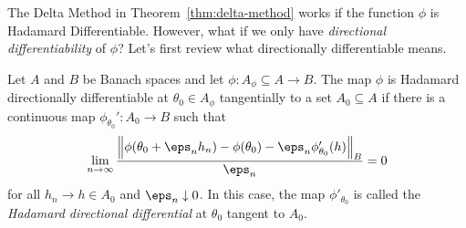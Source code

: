 The Delta Method in Theorem~\ref{thm:delta-method} works if the function \(\phi\) is Hadamard Differentiable. However, what if we only have  \textit{directional differentiability} of \(\phi\)? Let's first review what directionally differentiable means. 
\begin{definition}
	\label{def:directional-hadamard}
	Let \(A\) and  \(B\) be Banach spaces and let  \(\phi: A_\phi \subseteq A \to B\). The map  \(\phi\) is Hadamard directionally differentiable at  \(\theta_0 \in A_{\phi}\) tangentially to a set  \(A_0 \subseteq A\) if there is a continuous map  \(\phi_{\theta_0}':A_0\to B\) such that 
	\begin{equation}
		\label{eq:directional-hadamard}
		\lim_{n\to \infty}\frac{\left\|\phi(\theta_0 + \eps_n h_n)-\phi(\theta_0) - \eps_n\phi_{\theta_0}'(h)\right\|_B}{\eps_n} = 0
	\end{equation}
	for all \(h_n \to h\in A_0\) and \(\eps_n\downarrow 0\). In this case, the map \(\phi'_{\theta_0}\) is called the \textit{Hadamard directional differential} at \(\theta_0\) tangent to \(A_0\).
\end{definition}
